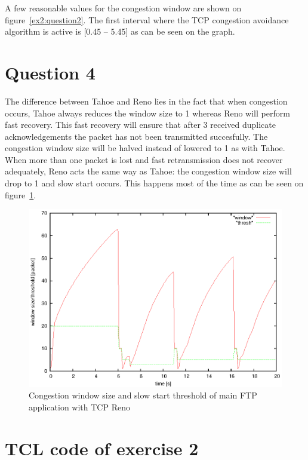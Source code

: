 \documentclass[a4paper]{report}
\begin{document}
A few reasonable values for the congestion window are shown on figure~\ref{ex2:question2}.
The first interval where the TCP congestion avoidance algorithm is active is [0.45 – 5.45] as can be seen on the graph.

\section*{Question 4}
The difference between Tahoe and Reno lies in the fact that when congestion occurs, Tahoe always reduces the window size to 1 whereas Reno will perform fast recovery. This fast recovery will ensure that after 3 received duplicate acknowledgements the packet has not been transmitted succesfully. The congestion window size will be halved instead of lowered to 1 as with Tahoe. When more than one packet is lost and fast retransmission does not recover adequately, Reno acts the same way as Tahoe: the congestion window size will drop to 1 and slow start occurs. This happens most of the time as can be seen on figure~\ref{ex2:question4}.
\begin{figure}[h]
\centerline{\includegraphics{pictures/E2Q4.eps}}
\caption{Congestion window size and slow start threshold of main FTP application with TCP Reno}
\label{ex2:question4}
\end{figure}
\newpage
\section*{TCL code of exercise 2}

\end{document}
